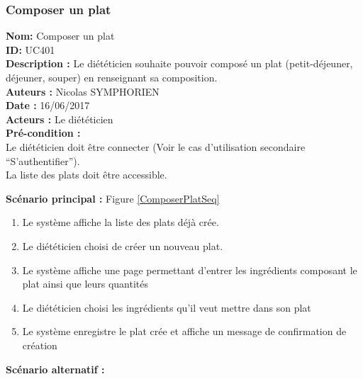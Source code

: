 \subsubsection{Composer un plat}

\noindent \textbf{Nom:} Composer un plat \\
\textbf{ID:} UC401\\
\textbf{Description :} Le diététicien souhaite pouvoir composé un plat (petit-déjeuner, déjeuner, souper) en renseignant sa composition.\\
\textbf{Auteurs :} Nicolas SYMPHORIEN\\
\textbf{Date :} 16/06/2017 \\
\textbf{Acteurs :} Le diététicien \\
\textbf{Pré-condition :} \\
Le diététicien doit être connecter (Voir le cas d'utilisation secondaire ``S'authentifier''). \\
La liste des plats doit être accessible.

\noindent \textbf{Scénario principal : } Figure \ref{ComposerPlatSeq}

\begin{enumerate}
	\item \label{UC401_step1}Le système affiche la liste des plats déjà crée.
	\item \label{UC401_step2}Le diététicien choisi de créer un nouveau plat.
	\item Le système affiche une page permettant d'entrer les ingrédients composant le plat ainsi que leurs quantités
	\item Le diététicien choisi les ingrédients qu'il veut mettre dans son plat
	\item Le système enregistre le plat crée et affiche un message de confirmation de création
\end{enumerate}

 \noindent \textbf{Scénario alternatif :}

